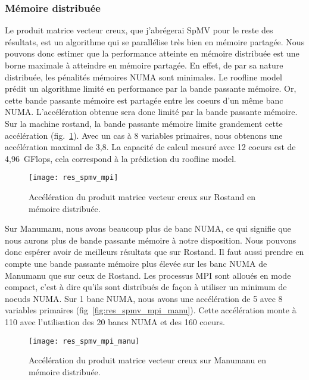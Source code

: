 \subsubsection{Mémoire distribuée}
Le produit matrice vecteur creux, que j'abrégerai SpMV pour le reste des résultats, est un algorithme qui se parallélise très bien en mémoire partagée.
%
Nous pouvons donc estimer que la performance atteinte en mémoire distribuée est une borne maximale à atteindre en mémoire partagée.
%
En effet, de par sa nature distribuée, les pénalités mémoires NUMA sont minimales.
%
Le roofline model prédit un algorithme limité en performance par la bande passante mémoire.
%
Or, cette bande passante mémoire est partagée entre les coeurs d'un même banc NUMA.
%
L'accélération obtenue sera donc limité par la bande passante mémoire.
%
Sur la machine rostand, la bande passante mémoire limite grandement cette accélération (fig.~\ref{fig:res_spmv_mpi_rostand}).
%
Avec un cas à 8 variables primaires, nous obtenons une accélération maximal de 3,8.
%
La capacité de calcul mesuré avec 12 coeurs est de 4,96~GFlops, cela correspond à la prédiction du roofline model.


\begin{figure}[t!]
  \centering
  \texttt{[image: res\_spmv\_mpi]}
  \caption{Accélération du produit matrice vecteur creux sur Rostand en mémoire distribuée.}
  \label{fig:res_spmv_mpi_rostand}
\end{figure}



Sur Manumanu, nous avons beaucoup plus de banc NUMA, ce qui signifie que nous aurons plus de bande passante mémoire à notre disposition.
%
Nous pouvons donc espérer avoir de meilleurs résultats que sur Rostand.
%
Il faut aussi prendre en compte une bande passante mémoire plus élevée sur les banc NUMA de Manumanu que sur ceux de Rostand.
%
Les processus MPI sont alloués en mode compact, c'est à dire qu'ils sont distribués de façon à utiliser un minimum de noeuds NUMA.
%
Sur 1 banc NUMA, nous avons une accélération de 5 avec 8 variables primaires (fig~\ref{fig:res_spmv_mpi_manu}).
%
Cette accélération monte à 110 avec l'utilisation des 20 bancs NUMA et des 160 coeurs.


\begin{figure}[t!]
  \centering
  \texttt{[image: res\_spmv\_mpi\_manu]}
  \caption{Accélération du produit matrice vecteur creux sur Manumanu en mémoire distribuée.}
  \label{fig:res_spmv_mpi_manumanu}
\end{figure}
